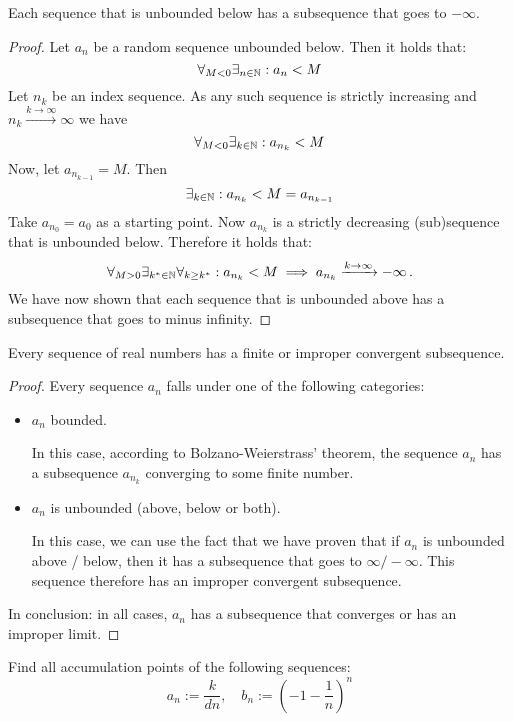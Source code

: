 \documentclass[week=4]{homework}
\begin{document}
\begin{questions}
        \begin{inlinetoprove}
        	Each sequence that is unbounded below has a subsequence that goes to $- \infty$.
        \end{inlinetoprove}
        \begin{proof}
        	Let $a_n$ be a random sequence unbounded below. Then it holds that:
        	\[
        	\forall_{M < 0} \exists_{n \in \mathbb{N}} : a_n < M
        	\]
        	Let $n_k$ be an index sequence. As any such sequence is strictly increasing and $n_k \xrightarrow{k\to\infty} \infty$ we have
        	\[
        	\forall_{M < 0} \exists_{k \in \mathbb{N}} : a_{n_{k}} < M
        	\]
        	Now, let $a_{n_{k-1}} = M$. Then
        	\[
        	\exists_{k \in \mathbb{N}} : a_{n_{k}} < M = a_{n_{k-1}}
        	\]
        	Take $a_{n_0} = a_0$ as a starting point. Now $a_{n_k}$ is a strictly decreasing (sub)sequence that is unbounded below. Therefore it holds that:
        	\[
        	\forall_{M > 0} \exists_{k^* \in \mathbb{N}} \forall_{k \ge k^*} : a_{n_k} < M \implies a_{n_k} \xrightarrow{k \to \infty} -\infty\,.
        	\]
        	We have now shown that each sequence that is unbounded above has a subsequence that goes to minus infinity.
        \end{proof}
        
        \begin{inlinetoprove}
        	Every sequence of real numbers has a finite or improper convergent subsequence. 
        \end{inlinetoprove}
        \begin{proof}
        	Every sequence $a_n$ falls under one of the following categories:
        	\begin{itemize}
        		\item $a_n$ bounded.
        		
	        	In this case, according to Bolzano-Weierstrass' theorem, the sequence $a_n$ has a subsequence $a_{n_k}$ converging to some finite number.
        	
        		\item $a_n$ is unbounded (above, below or both).
        		
		        In this case, we can use the fact that we have proven that if $a_n$ is unbounded above / below, then it has a subsequence that goes to $\infty / - \infty$. This sequence therefore has an improper convergent subsequence. 
        	\end{itemize}
        	In conclusion: in all cases, $a_n$ has a subsequence that converges or has an improper limit. 
        \end{proof}
        \question
        Find all accumulation points of the following sequences:
        \[
	        a_n := \frac{k}{dn}, \quad b_n := \left(-1-\frac{1}{n}\right)^n
        \]
        

\end{questions}
\end{document}

